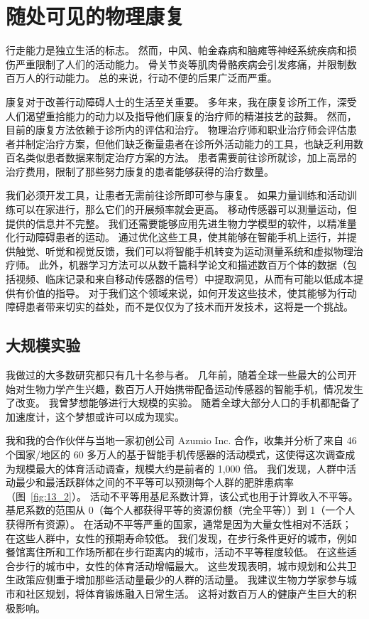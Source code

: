 \section{随处可见的物理康复}

行走能力是独立生活的标志。
然而，中风、帕金森病和脑瘫等神经系统疾病和损伤严重限制了人们的活动能力。
骨关节炎等肌肉骨骼疾病会引发疼痛，并限制数百万人的行动能力。
总的来说，行动不便的后果广泛而严重。


康复对于改善行动障碍人士的生活至关重要。
多年来，我在康复诊所工作，深受人们渴望重拾能力的动力以及指导他们康复的治疗师的精湛技艺的鼓舞。
然而，目前的康复方法依赖于诊所内的评估和治疗。
物理治疗师和职业治疗师会评估患者并制定治疗方案，但他们缺乏衡量患者在诊所外活动能力的工具，也缺乏利用数百名类似患者数据来制定治疗方案的方法。
患者需要前往诊所就诊，加上高昂的治疗费用，限制了那些努力康复的患者能够获得的治疗数量。


我们必须开发工具，让患者无需前往诊所即可参与康复。
如果力量训练和活动训练可以在家进行，那么它们的开展频率就会更高。
移动传感器可以测量运动，但提供的信息并不完整。
我们还需要能够应用先进生物力学模型的软件，以精准量化行动障碍患者的运动。
通过优化这些工具，使其能够在智能手机上运行，​​并提供触觉、听觉和视觉反馈，我们可以将智能手机转变为运动测量系统和虚拟物理治疗师。
此外，机器学习方法可以从数千篇科学论文和描述数百万个体的数据（包括视频、临床记录和来自移动传感器的信号）中提取洞见，从而有可能以低成本提供有价值的指导。
对于我们这个领域来说，如何开发这些技术，使其能够为行动障碍患者带来切实的益处，而不是仅仅为了技术而开发技术，这将是一个挑战。


\subsection{大规模实验}

我做过的大多数研究都只有几十名参与者。
几年前，随着全球一些最大的公司开始对生物力学产生兴趣，数百万人开始携带配备运动传感器的智能手机，情况发生了改变。
我曾梦想能够进行大规模的实验。
随着全球大部分人口的手机都配备了加速度计，这个梦想或许可以成为现实。


我和我的合作伙伴与当地一家初创公司 Azumio Inc. 合作，收集并分析了来自 46 个国家/地区的 60 多万人的基于智能手机传感器的活动模式，这使得这次调查成为规模最大的体育活动调查，规模大约是前者的 1,000 倍。
我们发现，人群中活动最少和最活跃群体之间的不平等可以预测每个人群的肥胖患病率（图~\ref{fig:13_2}）。
活动不平等用基尼系数计算，该公式也用于计算收入不平等。
基尼系数的范围从 0（每个人都获得平等的资源份额（完全平等））到 1（一个人获得所有资源）。
在活动不平等严重的国家，通常是因为大量女性相对不活跃；
在这些人群中，女性的预期寿命较低。
我们发现，在步行条件更好的城市，例如餐馆离住所和工作场所都在步行距离内的城市，活动不平等程度较低。
在这些适合步行的城市中，女性的体育活动增幅最大。
这些发现表明，城市规划和公共卫生政策应侧重于增加那些活动量最少的人群的活动量。
我建议生物力学家参与城市和社区规划，将体育锻炼融入日常生活。
这将对数百万人的健康产生巨大的积极影响。


